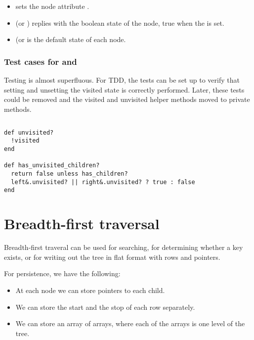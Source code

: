 \documentclass{article}
\begin{document}
\begin{itemize}
  \item {} sets the node attribute .
  \item {} (or ) replies with the boolean
    state of the node, true when the  is set.
  \item {} (or  is the default state
      of each node.
\end{itemize}

\subsubsection{Test cases for  and }

Testing is almost superfluous. For TDD, the tests can be set up
to verify that setting and unsetting the visited state is correctly
performed. Later, these tests could be removed and the visited and
unvisited helper methods moved to private methods.

\subsection{}

\begin{lstlisting}[frame=single,title=Helper methods for determining child's status.]
def unvisited?
  !visited
end

def has_unvisited_children?
  return false unless has_children?
  left&.unvisited? || right&.unvisited? ? true : false
end
\end{lstlisting}

\section{Breadth-first traversal}

Breadth-first traveral can be used for searching, for determining whether a key exists,
or for writing out the tree in flat format with rows and pointers.

For persistence, we have the following:

\begin{itemize}
\item At each node we can store pointers to each child.
\item We can store the start and the stop of each row separately.
\item We can store an array of arrays, where each of the arrays is
      one level of the tree.
\end{itemize}
\end{document}

